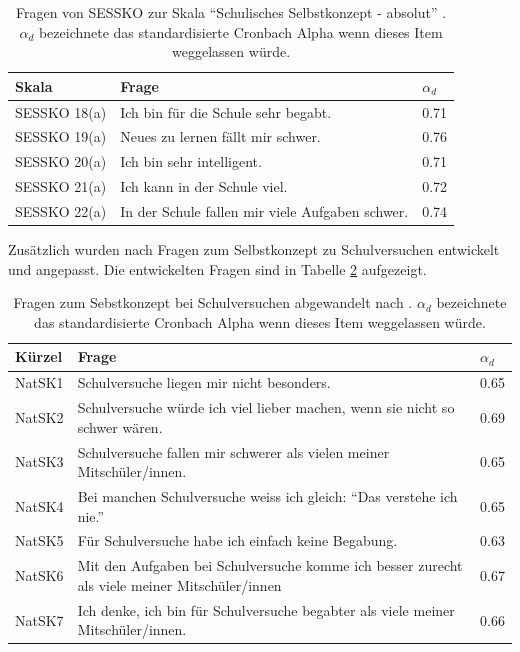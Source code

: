 \begin{table}[htbp]
  \centering
\begin{tabular}{@{}p{3cm}p{9cm}p{1cm}@{}}
\toprule Skala & Frage & $\alpha_d$  \\ 
\midrule SESSKO 18(a) & Ich bin für die Schule sehr begabt. &  0.71  \\ 
 SESSKO 19(a) & Neues zu lernen fällt mir schwer.  &  0.76 \\ 
 SESSKO 20(a) & Ich bin sehr intelligent. &  0.71  \\ 
 SESSKO 21(a) & Ich kann in der Schule viel. &  0.72   \\ 
 SESSKO 22(a) & In der Schule fallen mir viele Aufgaben schwer.  & 0.74   \\ 
\bottomrule 
\end{tabular} 
  \caption{Fragen von SESSKO zur Skala "`Schulisches Selbstkonzept - absolut"'  \citep{Schone2002}. $\alpha_d$ bezeichnete das standardisierte Cronbach Alpha wenn dieses Item weggelassen würde.}
  \label{tab:SESSKO}
\end{table}

Zusätzlich wurden nach \citet{Dierks2014} Fragen zum Selbstkonzept zu Schulversuchen entwickelt und angepasst. Die entwickelten Fragen sind in Tabelle \ref{tab:NatSK} aufgezeigt.

\begin{table}[htbp]
  \centering
\begin{tabular}{@{}p{2cm}p{10cm}p{1cm}@{}}
\toprule Kürzel & Frage & $\alpha_d$  \\ 
\midrule NatSK1 & Schulversuche liegen mir nicht besonders. &  0.65  \\ 
 NatSK2 & Schulversuche würde ich viel lieber machen, wenn sie nicht so schwer wären.  &  0.69 \\ 
 NatSK3 & Schulversuche fallen mir schwerer als vielen meiner Mitschüler/innen. &  0.65  \\ 
 NatSK4 & Bei manchen Schulversuche weiss ich gleich: "`Das verstehe ich nie."' &  0.65   \\ 
 NatSK5 & Für Schulversuche habe ich einfach keine Begabung.   & 0.63   \\ 
 NatSK6 & Mit den Aufgaben bei Schulversuche komme ich besser zurecht als viele meiner Mitschüler/innen  & 0.67   \\ 
 NatSK7 & Ich denke, ich bin für Schulversuche begabter als viele meiner Mitschüler/innen.  & 0.66   \\ 
\bottomrule 
\end{tabular} 
  \caption{Fragen zum Sebstkonzept bei Schulversuchen abgewandelt nach \citet{Dierks2014}. $\alpha_d$ bezeichnete das standardisierte Cronbach Alpha wenn dieses Item weggelassen würde.}
  \label{tab:NatSK}
\end{table}

